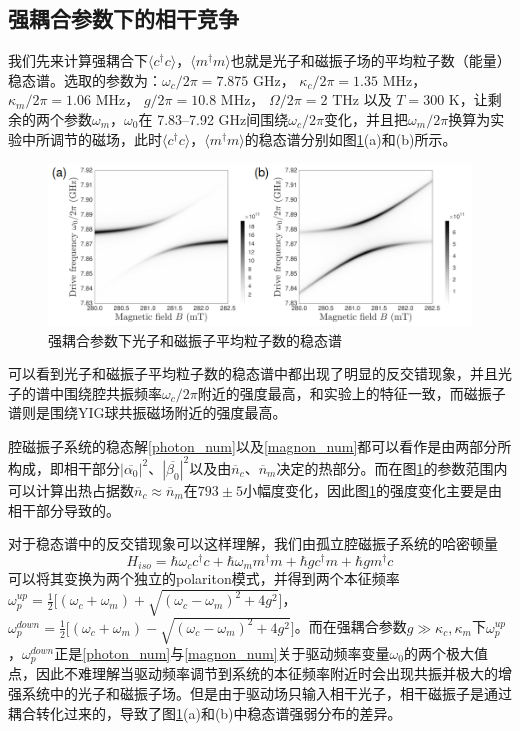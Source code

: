 \subsection{强耦合参数下的相干竞争}
我们先来计算强耦合下$\langle c^{\dag}c \rangle$，$\langle m^{\dag}m \rangle$也就是光子和磁振子场的平均粒子数（能量）稳态谱。选取的参数为：$\omega_c/2\pi=7.875$ GHz， $\kappa_c/2\pi=1.35$ MHz， $\kappa_m/2\pi=1.06$ MHz， $g/2\pi=10.8$ MHz， $\Omega/2\pi=2$ THz 以及 $T=300$ K，让剩余的两个参数$\omega_m$，$\omega_0$在 7.83--7.92 GHz间围绕$\omega_c/2\pi$变化，并且把$\omega_m/2\pi$换算为实验中所调节的磁场，此时$\langle c^{\dag}c \rangle$，$\langle m^{\dag}m \rangle$的稳态谱分别如图\ref{SC1stOrder}(a)和(b)所示。
\begin{figure}[htbp]
	\centering
	\includegraphics[width=2\basefigurewidth,clip]{./figure/4_1}
	\caption{强耦合参数下光子和磁振子平均粒子数的稳态谱} 
	\label{SC1stOrder}
\end{figure}
可以看到光子和磁振子平均粒子数的稳态谱中都出现了明显的反交错现象，并且光子的谱中围绕腔共振频率$\omega_c/2\pi$附近的强度最高，和实验上的特征一致，而磁振子谱则是围绕YIG球共振磁场附近的强度最高。

腔磁振子系统的稳态解\eqref{photon_num}以及\eqref{magnon_num}都可以看作是由两部分所构成，即相干部分$|\overline{\alpha_{0}}|^{2}$、$|\overline{\beta_{0}}|^{2}$以及由$\overline{n}_c$、$\overline{n}_m$决定的热部分。而在图\ref{SC1stOrder}的参数范围内可以计算出热占据数$\overline{n}_c\approx\overline{n}_m$在$793\pm5$小幅度变化，因此图\ref{SC1stOrder}的强度变化主要是由相干部分导致的。

对于稳态谱中的反交错现象可以这样理解，我们由孤立腔磁振子系统的哈密顿量
\begin{equation}
H_{iso} = \hbar\omega_{c}c^{\dag}c+\hbar\omega_{m}m^{\dag}m+\hbar gc^{\dag}m+\hbar gm^{\dag}c
\label{HamiltonianIsolated}
\end{equation}
可以将其变换为两个独立的polariton模式，并得到两个本征频率$\omega_p^{up}=\frac{1}{2}\Big[(\omega_c+\omega_m)+\sqrt{(\omega_c-\omega_m)^2+4g^2}\Big]$，$\omega_p^{down}=\frac{1}{2}\Big[(\omega_c+\omega_m)-\sqrt{(\omega_c-\omega_m)^2+4g^2}\Big]$。而在强耦合参数$g\gg\kappa_c,\kappa_m$下$\omega_p^{up}$，$\omega_p^{down}$正是\eqref{photon_num}与\eqref{magnon_num}关于驱动频率变量$\omega_0$的两个极大值点，因此不难理解当驱动频率调节到系统的本征频率附近时会出现共振并极大的增强系统中的光子和磁振子场。但是由于驱动场只输入相干光子，相干磁振子是通过耦合转化过来的，导致了图\ref{SC1stOrder}(a)和(b)中稳态谱强弱分布的差异。

